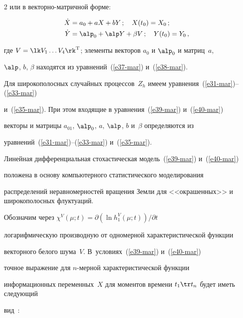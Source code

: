 \begin{multicols}{2}
или в векторно-мат\-рич\-ной форме:


\begin{align}


\dot X &= a_0 + aX +bY\,;\quad X(t_0) = X_0\,;\label{e39-mar}\\


\dot Y&=\alp_0 +\alp Y +\beta V\,;\quad Y(t_0) = Y_0\,,\label{e40-mar}


\end{align}


где $V =\lk V_1\ldots V_4\rk^{\mathrm{T}}$; элементы векторов $a_0$ и $\alp_0$ и мат\-риц~$a$,


$\alp$, $b$, $\beta$ находятся из уравнений~(\ref{e37-mar}) и~(\ref{e38-mar}).





Для широкополосных  случайных процессов~$Z_h$ имеем уравнения~(\ref{e31-mar})--(\ref{e33-mar}) 


и~(\ref{e35-mar}). При этом входящие в уравнения~(\ref{e39-mar}) и~(\ref{e40-mar})


 векторы и мат\-ри\-цы $a_{01}$, $\alp_0$, $a$, $\alp$, $b$ и~$\beta$ определяются из 


 уравнений~(\ref{e31-mar})--(\ref{e33-mar}) и~(\ref{e35-mar}).





Линейная дифференциальная стохастическая модель~(\ref{e39-mar}) и~(\ref{e40-mar}) 


положена в основу компьютерного статистического моделирования


распределений неравномерностей вращения Земли для <<окрашенных>>  и широкополосных флуктуаций.





Обозначим через  $\chi^V (\mu;t) ={\partial (\ln h_1^V (\mu;t))}/{\partial t}$


логарифмическую производную от одномерной характеристической функции


векторного белого шума~$V$. В~условиях~(\ref{e39-mar}) и~(\ref{e40-mar}) 


точное выражение для $n$-мер\-ной характеристической функции


информационных переменных~$X$ для моментов времени $t_1\tr t_n$  будет иметь следующий 


вид~\cite{11-mar}:


\begin{multline}



\end{multline}
\end{multicols}
